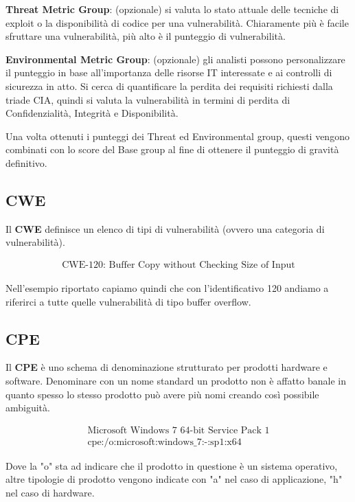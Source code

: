 \textbf{Threat Metric Group}: (opzionale) si valuta lo stato attuale delle 
tecniche di exploit o la disponibilità di codice per una vulnerabilità. 
Chiaramente più è facile sfruttare una vulnerabilità, più alto è il punteggio 
di vulnerabilità.

\textbf{Environmental Metric Group}: (opzionale) gli analisti possono 
personalizzare il punteggio in base all'importanza delle risorse IT interessate
e ai controlli di sicurezza in atto. Si cerca di quantificare la perdita dei requisiti
richiesti dalla triade CIA, quindi si valuta la vulnerabilità in termini di perdita
di Confidenzialità, Integrità e Disponibilità.

Una volta ottenuti i punteggi dei Threat ed Environmental group, questi vengono
combinati con lo score del Base group al fine di ottenere il punteggio di gravità
definitivo.

\subsection{CWE}

Il \textbf{CWE} definisce un elenco di tipi di vulnerabilità (ovvero una 
categoria di vulnerabilità).

\begin{gather*}
    \text{CWE-120: Buffer Copy without Checking Size of Input}
\end{gather*}

Nell'esempio riportato capiamo quindi che con l'identificativo 120 andiamo a 
riferirci a tutte quelle vulnerabilità di tipo buffer overflow.

\subsection{CPE}

Il \textbf{CPE} è uno schema di denominazione strutturato per prodotti hardware e software.
Denominare con un nome standard un prodotto non è affatto banale in quanto spesso
lo stesso prodotto può avere più nomi creando così possibile ambiguità.

\begin{gather*}
    \text{Microsoft Windows 7 64-bit Service Pack 1}\\
    \text{cpe:/o:microsoft:windows\_7:-:sp1:x64}
\end{gather*}

Dove la "o" sta ad indicare che il prodotto in questione è un sistema operativo,
altre tipologie di prodotto vengono indicate con "a" nel caso di applicazione, "h"
nel caso di hardware.

